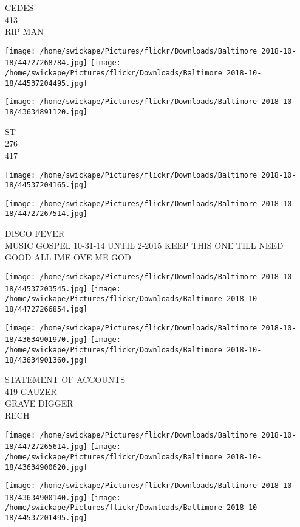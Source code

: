 \documentclass[10pt,letterpaper]{article}
\begin{document}
CEDES\\
413\\
RIP MAN
\pagebreak

\texttt{[image: /home/swickape/Pictures/flickr/Downloads/Baltimore 2018-10-18/44727268784.jpg]}
\texttt{[image: /home/swickape/Pictures/flickr/Downloads/Baltimore 2018-10-18/44537204495.jpg]}

\vspace{0.25in}
\texttt{[image: /home/swickape/Pictures/flickr/Downloads/Baltimore 2018-10-18/43634891120.jpg]}

ST\\
276\\
417
\pagebreak

\texttt{[image: /home/swickape/Pictures/flickr/Downloads/Baltimore 2018-10-18/44537204165.jpg]}

\vspace{0.25in}
\texttt{[image: /home/swickape/Pictures/flickr/Downloads/Baltimore 2018-10-18/44727267514.jpg]}

DISCO FEVER\\
MUSIC GOSPEL 10{-}31{-}14 UNTIL 2{-}2015 KEEP THIS ONE TILL NEED GOOD ALL IME OVE ME GOD
\pagebreak

\texttt{[image: /home/swickape/Pictures/flickr/Downloads/Baltimore 2018-10-18/44537203545.jpg]}
\texttt{[image: /home/swickape/Pictures/flickr/Downloads/Baltimore 2018-10-18/44727266854.jpg]}

\texttt{[image: /home/swickape/Pictures/flickr/Downloads/Baltimore 2018-10-18/43634901970.jpg]}
\texttt{[image: /home/swickape/Pictures/flickr/Downloads/Baltimore 2018-10-18/43634901360.jpg]}

STATEMENT OF ACCOUNTS\\
419 GAUZER\\
GRAVE DIGGER\\
RECH
\pagebreak

\texttt{[image: /home/swickape/Pictures/flickr/Downloads/Baltimore 2018-10-18/44727265614.jpg]}
\texttt{[image: /home/swickape/Pictures/flickr/Downloads/Baltimore 2018-10-18/43634900620.jpg]}

\texttt{[image: /home/swickape/Pictures/flickr/Downloads/Baltimore 2018-10-18/43634900140.jpg]}
\texttt{[image: /home/swickape/Pictures/flickr/Downloads/Baltimore 2018-10-18/44537201495.jpg]}
\end{document}
